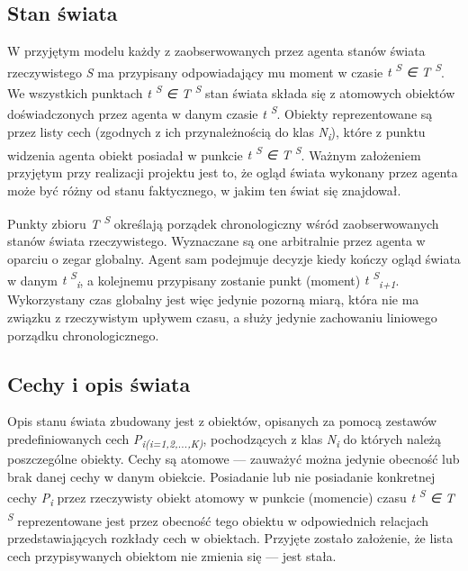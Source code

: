 	
	\subsection{Stan świata}
	
	W przyjętym modelu każdy z zaobserwowanych przez agenta stanów świata rzeczywistego \textit{S} ma przypisany odpowiadający mu moment w czasie 
	\textit{t\textsuperscript{ S} ∈ T\textsuperscript{ S}}. 
	We wszystkich punktach 
	\textit{t\textsuperscript{ S} ∈ T\textsuperscript{ S}} 
	stan świata składa się z atomowych obiektów doświadczonych przez agenta w danym czasie 
	\textit{t\textsuperscript{ S}}.
	Obiekty reprezentowane są przez listy cech (zgodnych z ich przynależnością do klas 
	\textit{N\textsubscript{i}}), 
	które z punktu widzenia agenta obiekt posiadał w punkcie 
	\textit{t\textsuperscript{ S} ∈ T\textsuperscript{ S}}.
	Ważnym założeniem przyjętym przy realizacji projektu jest to, że ogląd świata wykonany przez agenta może być różny od stanu faktycznego, w jakim ten świat się znajdował.
	
	
	Punkty zbioru 
	\textit{T\textsuperscript{ S}} 
	określają porządek chronologiczny wśród zaobserwowanych stanów świata rzeczywistego. Wyznaczane są one arbitralnie przez agenta w oparciu o zegar globalny. Agent sam podejmuje decyzje kiedy kończy ogląd świata w danym 
	\textit{t\textsuperscript{ S}\textsubscript{i}}, 
	a kolejnemu przypisany zostanie punkt (moment)
	\textit{t\textsuperscript{ S}\textsubscript{i+1}}.
	Wykorzystany czas globalny jest więc jedynie pozorną miarą, która nie ma związku z rzeczywistym upływem czasu, a służy jedynie zachowaniu liniowego porządku chronologicznego.
	
	
	\subsection{Cechy i opis świata}
	
	Opis stanu świata zbudowany jest z obiektów, opisanych za pomocą zestawów predefiniowanych cech 
	\textit{P\textsubscript{i(i=1,2,...,K)}}, 
	pochodzących z klas 
	\textit{N\textsubscript{i}} 
	do których należą poszczególne obiekty. Cechy są atomowe --- zauważyć można jedynie obecność lub brak danej cechy w danym obiekcie. Posiadanie lub nie posiadanie konkretnej cechy
	\textit{P\textsubscript{i}}
	przez rzeczywisty obiekt atomowy w punkcie (momencie) czasu
	\textit{t\textsuperscript{ S} ∈ T\textsuperscript{ S}} 
	reprezentowane jest przez obecność tego obiektu w odpowiednich relacjach przedstawiających rozkłady cech w obiektach. Przyjęte zostało założenie, że lista cech przypisywanych obiektom nie zmienia się --- jest stała. 

